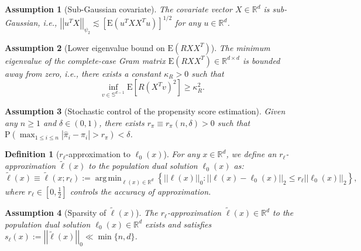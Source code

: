 \documentclass[10pt,a4paper]{amsart}
\theoremstyle{plain}
\newtheorem{definition}[theorem]{Definition}
\newtheorem{assumption}{Assumption}
\theoremstyle{remark}
\renewcommand{\hat}{\widehat}
\renewcommand{\tilde}{\widetilde}
\newcommand{\norm}[1]{\left|\left| #1 \right|\right|}
\DeclareMathOperator*{\argmin}{arg\,min}
\begin{document}
\begin{assumption}[Sub-Gaussian covariate]
	\label{assump:sub_gaussian}
	The covariate vector $X\in \mathbb{R}^d$ is sub-Gaussian, \emph{i.e.}, $\norm{u^TX}_{\psi_2} \lesssim \left[\mathrm{E}\left(u^TXX^T u\right)\right]^{1/2}$ for any $u\in \mathbb{R}^d$.
\end{assumption}

\begin{assumption}[Lower eigenvalue bound on $\mathrm{E}\left(RXX^T\right)$]
	\label{assump:gram_lower_bnd}
	The minimum eigenvalue of the complete-case Gram matrix $\mathrm{E}\left(RXX^T\right) \in \mathbb{R}^{d\times d}$ is bounded away from zero, \emph{i.e.}, there exists a constant $\kappa_R>0$ such that 
	$$ \inf_{v\in \mathbb{S}^{d-1}} \mathrm{E}\left[R(X^Tv)^2\right] \geq \kappa_R^2.$$
\end{assumption}

\begin{assumption}[Stochastic control of the propensity score estimation]
	\label{assump:prop_consistent_rate}
	Given any $n\geq 1$ and $\delta \in (0,1)$, there exists $r_{\pi} \equiv r_{\pi}(n,\delta) >0$ such that $\mathrm{P}\left(\max_{1 \leq i \leq n}\left|\hat{\pi}_i -\pi_i \right| > r_{\pi}\right) <\delta$.
\end{assumption}

\begin{definition}[$r_{\ell}$-approximation to $\ell_0(x)$]
	\label{defn:popul_dual}
	For any $x\in \mathbb{R}^d$, we define an $r_{\ell}$-approximation $\tilde{\ell}(x)$ to the population dual solution $\ell_0(x)$ as:
	\begin{equation}
		\label{popul_dual_approx}
		\tilde{\ell}(x) \equiv \tilde{\ell}(x;r_{\ell}):= \argmin_{\ell(x)\in \mathbb{R}^d} \left\{\norm{\ell(x)}_0: \norm{\ell(x) - \ell_0(x)}_2 \leq r_{\ell}\norm{\ell_0(x)}_2 \right\},
	\end{equation}
	where $r_{\ell} \in \left[0,\frac{1}{2}\right]$ controls the accuracy of approximation.
\end{definition}

\begin{assumption}[Sparsity of $\tilde{\ell}(x)$]
	\label{assump:sparse_dual}
	The $r_{\ell}$-approximation $\tilde{\ell}(x) \in \mathbb{R}^d$ to the population dual solution $\ell_0(x)\in \mathbb{R}^d$ exists and satisfies
	$s_{\ell}(x) := \norm{\tilde{\ell}(x)}_0 \ll \min\{n,d\}$.
\end{assumption}
\end{document}
